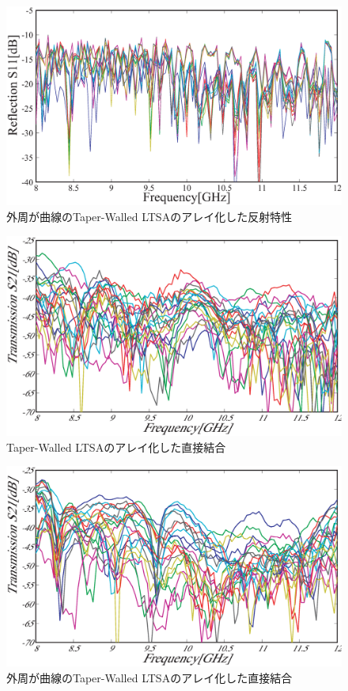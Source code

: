 ﻿\documentclass[12pt,oneside]{jsbook}
\begin{document}
\begin{figure}[t]
\begin{center}
\includegraphics[width =\hsize]{new_S11.eps}
\caption{外周が曲線のTaper-Walled LTSAのアレイ化した反射特性}
\label{pic:ctwltsa-1} 
\end{center}
\end{figure}

\begin{figure}[t]
\begin{center}
\includegraphics[width =\hsize]{old_S21_dc_e.eps}
\caption{Taper-Walled LTSAのアレイ化した直接結合} \label{pic:twltsa-2} 
\end{center}
\end{figure}

\begin{figure}[t]
\begin{center}
\includegraphics[width =\hsize]{new_S21_dc_e.eps}
\caption{外周が曲線のTaper-Walled LTSAのアレイ化した直接結合}
\label{pic:ctwltsa-2} 
\end{center}
\end{figure}
\end{document}
